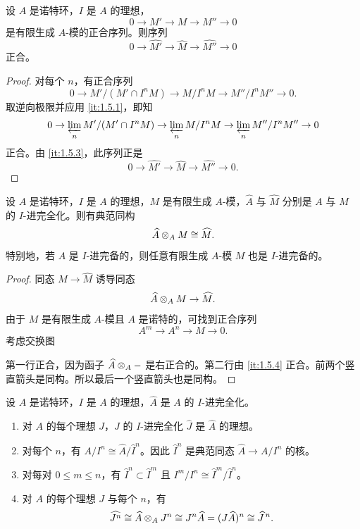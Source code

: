 \begin{proposition}\label{it:1.5.4}
设 $A$ 是诺特环，$I$ 是 $A$ 的理想，
\[
0\to M'\to M\to M''\to 0
\]
是有限生成 $A$-模的正合序列。则序列
\[
0\to\widehat{M'}\to\widehat M\to\widehat{M''}\to 0
\]
正合。
\end{proposition}

\begin{proof}
对每个 $n$，有正合序列
\[
0\to M'/(M'\cap I^nM)\to M/I^nM\to M''/I^nM''\to 0.
\]
取逆向极限并应用 \ref{it:1.5.1}，即知
\[
0\to\varprojlim_n M'/(M'\cap I^nM)\to\varprojlim_n M/I^nM\to\varprojlim_n M''/I^nM''\to 0
\]
正合。由 \ref{it:1.5.3}，此序列正是
\[
0\to\widehat{M'}\to\widehat M\to\widehat{M''}\to 0.
\]
\end{proof}

\begin{proposition}\label{it:1.5.5}
设 $A$ 是诺特环，$I$ 是 $A$ 的理想，$M$ 是有限生成 $A$-模，$\widehat A$ 与 $\widehat M$ 分别是 $A$ 与 $M$ 的 $I$-进完全化。则有典范同构
\[
\widehat A\otimes_A M\cong\widehat M.
\]
特别地，若 $A$ 是 $I$-进完备的，则任意有限生成 $A$-模 $M$ 也是 $I$-进完备的。
\end{proposition}

\begin{proof}
同态 $M\to\widehat M$ 诱导同态
\[
\widehat A\otimes_A M\to\widehat M.
\]
由于 $M$ 是有限生成 $A$-模且 $A$ 是诺特的，可找到正合序列
\[
A^m\to A^n\to M\to 0.
\]
考虑交换图
\begin{center}
\end{center}
第一行正合，因为函子 $\widehat A\otimes_A -$ 是右正合的。第二行由 \ref{it:1.5.4} 正合。前两个竖直箭头是同构。所以最后一个竖直箭头也是同构。
\end{proof}

\begin{corollary}\label{it:1.5.6}
设 $A$ 是诺特环，$I$ 是 $A$ 的理想，$\widehat A$ 是 $A$ 的 $I$-进完全化。
\begin{enumerate}[label=(\roman*),leftmargin=2.8em]
  \item 对 $A$ 的每个理想 $J$，$J$ 的 $I$-进完全化 $\widehat J$ 是 $\widehat A$ 的理想。
  \item 对每个 $n$，有 $A/I^n\cong\widehat A/\widehat I^n$。因此 $\widehat I^n$ 是典范同态 $\widehat A\to A/I^n$ 的核。
  \item 对每对 $0\le m\le n$，有 $\widehat I^n\subset\widehat I^m$ 且 $I^m/I^n\cong\widehat I^m/\widehat I^n$。
  \item 对 $A$ 的每个理想 $J$ 与每个 $n$，有
  \[
  \widehat{J^n}\cong\widehat A\otimes_A J^n\cong J^n\widehat A=(J\widehat A)^n\cong\widehat J^{\,n}.
  \]
\end{enumerate}
\end{corollary}

